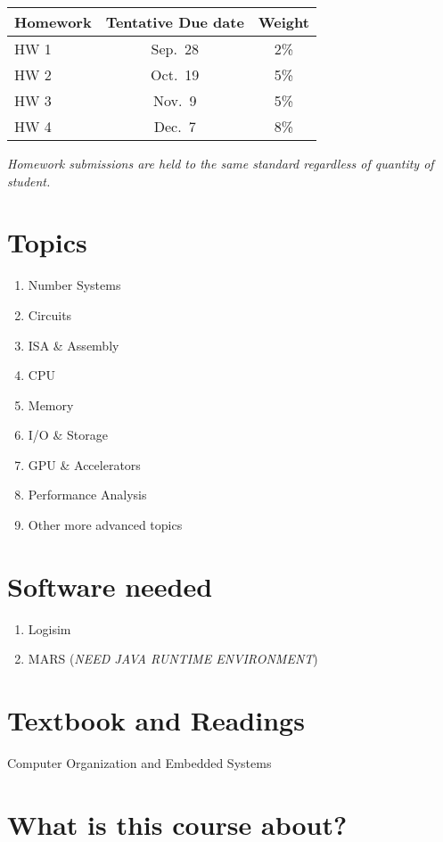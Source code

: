 \begin{tabular}{@{}lcc@{}}
\toprule
\textbf{Homework} & \textbf{Tentative Due date} & \textbf{Weight}\\
\midrule
HW 1 & Sep.\ 28 & 2\%\\
HW 2 & Oct.\ 19 & 5\%\\
HW 3 & Nov.\ 9  & 5\%\\
HW 4 & Dec.\ 7  & 8\%\\
\bottomrule
\end{tabular}

\emph{Homework submissions are held to the same standard regardless of quantity of student.}

\section{Topics}

\begin{enumerate}
    \item Number Systems
    \item Circuits 
    \item ISA \& Assembly 
    \item CPU 
    \item Memory 
    \item I/O \& Storage
    \item GPU \& Accelerators 
    \item Performance Analysis
    \item Other more advanced topics
\end{enumerate}

\section{Software needed}
\begin{enumerate}
    \item Logisim
    \item MARS (\emph{NEED JAVA RUNTIME ENVIRONMENT})
\end{enumerate}

\section{Textbook and Readings}

Computer Organization and Embedded Systems 

\section{What is this course about?}

